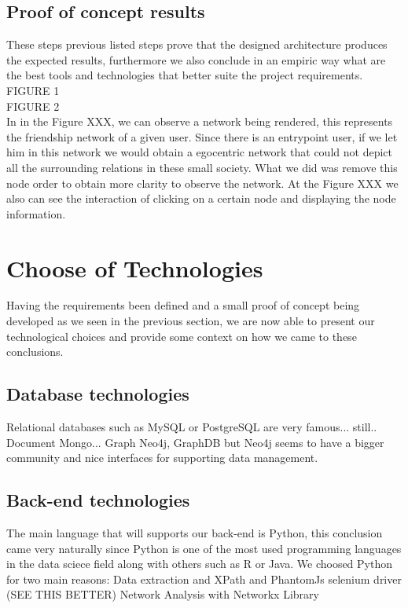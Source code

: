 \subsection{Proof of concept results}
\indent These steps previous listed steps prove that the designed architecture produces the expected results, furthermore we also conclude in an empiric way what are
the best tools and technologies that better suite the project requirements.\\

FIGURE 1\\
FIGURE 2\\

\indent In in the Figure XXX, we can observe a network being rendered, this represents the friendship network of a given user. Since there is an entrypoint user, if we let him
in this network we would obtain a egocentric network that could not depict all the surrounding relations in these small society. What we did was remove this node order to obtain
more clarity to observe the network. At the Figure XXX we also can see the interaction of clicking on a certain node and displaying the node information.

\section{Choose of Technologies}
Having the requirements been defined and a small proof of concept being developed as we seen in the previous section, we are now able to present our technological choices
and provide some context on how we came to these conclusions.

\subsection{Database technologies}
Relational databases such as MySQL or PostgreSQL are very famous... still.. Document Mongo... Graph Neo4j, GraphDB but
Neo4j seems to have a bigger community and nice interfaces for supporting data management.


\subsection{Back-end technologies}
The main language that will supports our back-end is Python, this conclusion came very naturally since Python is one of the most used programming languages in the data
sciece field along with others such as R or Java. We choosed Python for two main reasons:
Data extraction and XPath and PhantomJs selenium driver (SEE THIS BETTER)
Network Analysis with Networkx Library

